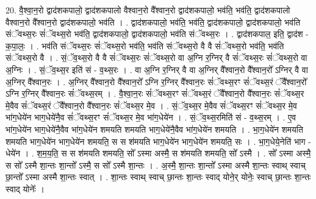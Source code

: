 \documentclass[17pt]{extarticle}
\begin{document}
20. वै॒श्वा॒न॒रो द्वाद॑शकपालो॒ द्वाद॑शकपालो वैश्वान॒रो वै᳚श्वान॒रो द्वाद॑शकपालो॒ भव॑ति॒ भव॑ति॒ द्वाद॑शकपालो वैश्वान॒रो वै᳚श्वान॒रो द्वाद॑शकपालो॒ भव॑ति । . द्वाद॑शकपालो॒ भव॑ति॒ भव॑ति॒ द्वाद॑शकपालो॒ द्वाद॑शकपालो॒ भव॑ति संॅवथ्स॒रः सं॑ॅवथ्स॒रो भव॑ति॒ द्वाद॑शकपालो॒ द्वाद॑शकपालो॒ भव॑ति संॅवथ्स॒रः । . द्वाद॑शकपाल॒ इति॒ द्वाद॑श - क॒पा॒लः॒ । . भव॑ति संॅवथ्स॒रः सं॑ॅवथ्स॒रो भव॑ति॒ भव॑ति संॅवथ्स॒रो वै वै सं॑ॅवथ्स॒रो भव॑ति॒ भव॑ति संॅवथ्स॒रो वै । . सं॒ॅव॒थ्स॒रो वै वै सं॑ॅवथ्स॒रः सं॑ॅवथ्स॒रो वा अ॒ग्नि र॒ग्निर् वै सं॑ॅवथ्स॒रः सं॑ॅवथ्स॒रो वा अ॒ग्निः । . सं॒ॅव॒थ्स॒र इति॑ सं - व॒थ्स॒रः । . वा अ॒ग्नि र॒ग्निर् वै वा अ॒ग्निर् वै᳚श्वान॒रो वै᳚श्वान॒रो᳚ ऽग्निर् वै वा अ॒ग्निर् वै᳚श्वान॒रः । . अ॒ग्निर् वै᳚श्वान॒रो वै᳚श्वान॒रो᳚ ऽग्नि र॒ग्निर् वै᳚श्वान॒रः सं॑ॅवथ्स॒रꣳ सं॑ॅवथ्स॒रं ॅवै᳚श्वान॒रो᳚ ऽग्नि र॒ग्निर् वै᳚श्वान॒रः सं॑ॅवथ्स॒रम् । . वै॒श्वा॒न॒रः सं॑ॅवथ्स॒रꣳ सं॑ॅवथ्स॒रं ॅवै᳚श्वान॒रो वै᳚श्वान॒रः सं॑ॅवथ्स॒र मे॒वैव सं॑ॅवथ्स॒रं ॅवै᳚श्वान॒रो वै᳚श्वान॒रः सं॑ॅवथ्स॒र मे॒व । . सं॒ॅव॒थ्स॒र मे॒वैव सं॑ॅवथ्स॒रꣳ सं॑ॅवथ्स॒र मे॒व भा॑ग॒धेये॑न भाग॒धेये॑नै॒व सं॑ॅवथ्स॒रꣳ सं॑ॅवथ्स॒र मे॒व भा॑ग॒धेये॑न । . सं॒ॅव॒थ्स॒रमिति॑ सं - व॒थ्स॒रम् । . ए॒व भा॑ग॒धेये॑न भाग॒धेये॑नै॒वैव भा॑ग॒धेये॑न शमयति शमयति भाग॒धेये॑नै॒वैव भा॑ग॒धेये॑न शमयति । . भा॒ग॒धेये॑न शमयति शमयति भाग॒धेये॑न भाग॒धेये॑न शमयति॒ स स श॑मयति भाग॒धेये॑न भाग॒धेये॑न शमयति॒ सः । . भा॒ग॒धेये॒नेति॑ भाग - धेये॑न । . श॒म॒य॒ति॒ स स श॑मयति शमयति॒ सो᳚ ऽस्मा अस्मै॒ स श॑मयति शमयति॒ सो᳚ ऽस्मै । . सो᳚ ऽस्मा अस्मै॒ स सो᳚ ऽस्मै शा॒न्तः शा॒न्तो᳚ ऽस्मै॒ स सो᳚ ऽस्मै शा॒न्तः । . अ॒स्मै॒ शा॒न्तः शा॒न्तो᳚ ऽस्मा अस्मै शा॒न्तः स्वाथ् स्वाच् छा॒न्तो᳚ ऽस्मा अस्मै शा॒न्तः स्वात् । . शा॒न्तः स्वाथ् स्वाच् छा॒न्तः शा॒न्तः स्वाद् योने॒र् योनेः॒ स्वाच् छा॒न्तः शा॒न्तः स्वाद् योनेः᳚ । \newline
\end{document}

